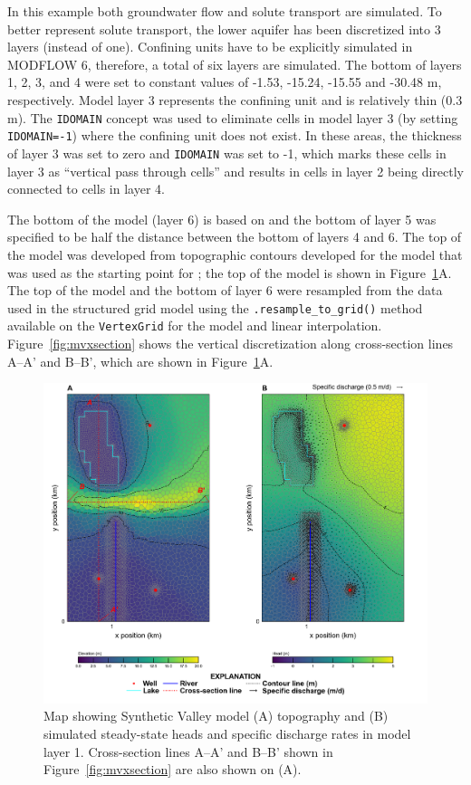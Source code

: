 \documentclass[12pt, oneside]{article}  	%
\begin{document}
In this example both groundwater flow and solute transport are simulated. To better represent solute transport, the lower aquifer has been discretized into 3 layers (instead of one). Confining units have to be explicitly simulated in MODFLOW 6, therefore, a total of six layers are simulated. The bottom of layers 1, 2, 3, and 4 were set to constant values of -1.53, -15.24, -15.55 and -30.48 m, respectively. Model layer 3 represents the confining unit and is relatively thin (0.3 m). The \texttt{IDOMAIN} concept \citep{modflow6gwf} was used to eliminate cells in model layer 3 (by setting \texttt{IDOMAIN=-1}) where the confining unit does not exist. In these areas, the thickness of layer 3 was set to zero and \texttt{IDOMAIN} was set to -1, which marks these cells in layer 3 as ``vertical pass through cells'' and results in cells in layer 2 being directly connected to cells in layer 4. 

The bottom of the model (layer 6) is based on \cite{hill1998} and the bottom of layer 5 was specified to be half the distance between the bottom of layers 4 and 6. The top of the model was developed from topographic contours developed for the model that was used as the starting point for \cite{hill1998} \citep{pollock2014percomm}; the top of the model is shown in Figure~\ref{fig:mvmap}A. The top of the model and the bottom of layer 6 were resampled from the data used in the structured grid model using the \texttt{.resample\_to\_grid()} method available on the \texttt{VertexGrid} for the model and linear interpolation. Figure~\ref{fig:mvxsection} shows the vertical discretization along cross-section lines A--A' and B--B', which are shown in Figure~\ref{fig:mvmap}A.

\begin{figure}[ht!]
	\begin{center}
		\includegraphics{figures/mv_voronoi_map.png}
	\end{center}
	\caption{Map showing Synthetic Valley model (A) topography and (B) simulated steady-state heads and specific discharge rates in model layer 1. Cross-section lines A--A' and B--B' shown in Figure~\ref{fig:mvxsection} are also shown on (A).}
	\label{fig:mvmap}
\end{figure}
\end{document}
